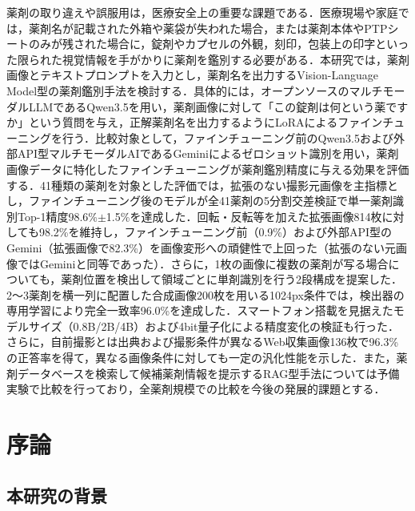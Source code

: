 \documentclass[dvipdfmx]{jsarticle}
\begin{document}
薬剤の取り違えや誤服用は，医療安全上の重要な課題である．医療現場や家庭では，薬剤名が記載された外箱や薬袋が失われた場合，または薬剤本体やPTPシートのみが残された場合に，錠剤やカプセルの外観，刻印，包装上の印字といった限られた視覚情報を手がかりに薬剤を鑑別する必要がある．本研究では，薬剤画像とテキストプロンプトを入力とし，薬剤名を出力するVision-Language Model型の薬剤鑑別手法を検討する．具体的には，オープンソースのマルチモーダルLLMであるQwen3.5を用い，薬剤画像に対して「この錠剤は何という薬ですか」という質問を与え，正解薬剤名を出力するようにLoRAによるファインチューニングを行う．比較対象として，ファインチューニング前のQwen3.5および外部API型マルチモーダルAIであるGeminiによるゼロショット識別を用い，薬剤画像データに特化したファインチューニングが薬剤鑑別精度に与える効果を評価する．41種類の薬剤を対象とした評価では，拡張のない撮影元画像を主指標とし，ファインチューニング後のモデルが全41薬剤の5分割交差検証で単一薬剤識別Top-1精度98.6\%$\pm$1.5\%を達成した．回転・反転等を加えた拡張画像814枚に対しても98.2\%を維持し，ファインチューニング前（0.9\%）および外部API型のGemini（拡張画像で82.3\%）を画像変形への頑健性で上回った（拡張のない元画像ではGeminiと同等であった）．さらに，1枚の画像に複数の薬剤が写る場合についても，薬剤位置を検出して領域ごとに単剤識別を行う2段構成を提案した．2〜3薬剤を横一列に配置した合成画像200枚を用いる1024px条件では，検出器の専用学習により完全一致率96.0\%を達成した．スマートフォン搭載を見据えたモデルサイズ（0.8B/2B/4B）および4bit量子化による精度変化の検証も行った．さらに，自前撮影とは出典および撮影条件が異なるWeb収集画像136枚で96.3\%の正答率を得て，異なる画像条件に対しても一定の汎化性能を示した．また，薬剤データベースを検索して候補薬剤情報を提示するRAG型手法については予備実験で比較を行っており，全薬剤規模での比較を今後の発展的課題とする．

\newpage

\tableofcontents
\newpage
\setcounter{page}{1}
\pagestyle{plain}

\section{序論}\label{sec1}

\subsection{本研究の背景}
\end{document}
